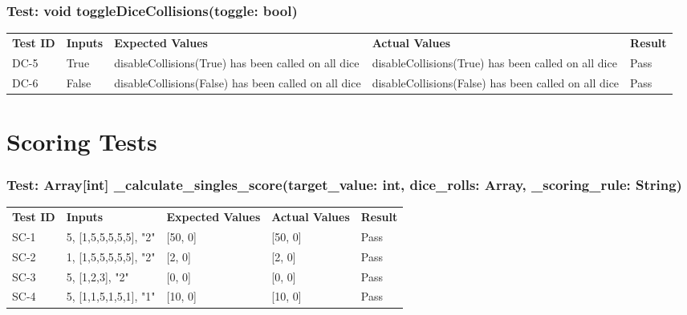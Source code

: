 \documentclass[12pt, titlepage]{article}
\begin{document}
\subsubsection{Test: void toggleDiceCollisions(toggle: bool)}
\begin{tabularx}{\textwidth}{|p{2cm}|p{3.5cm}|p{4cm}|p{4cm}|p{1.5cm}|}
    \cline{1-5}
    \textbf{Test ID} & \textbf{Inputs} & \textbf{Expected Values} & \textbf{Actual Values} & \textbf{Result} \\
    \cline{1-5}
    DC-5 & True & disableCollisions(True) has been called on all dice & disableCollisions(True) has been called on all dice & Pass \\
    \cline{1-5}
    DC-6 & False & disableCollisions(False) has been called on all dice & disableCollisions(False) has been called on all dice & Pass \\
    \cline{1-5}
\end{tabularx}

\section{Scoring Tests}

\subsubsection{Test: Array[int] \_calculate\_singles\_score(target\_value: int, dice\_rolls: Array, \_scoring\_rule: String)}
\begin{tabularx}{\textwidth}{|p{2cm}|p{3.5cm}|p{4cm}|p{4cm}|p{1.5cm}|}
    \cline{1-5}
    \textbf{Test ID} & \textbf{Inputs} & \textbf{Expected Values} & \textbf{Actual Values} & \textbf{Result} \\
    \cline{1-5}
    SC-1 & 5, [1,5,5,5,5,5], "2" & [50, 0] & [50, 0] & Pass \\
    \cline{1-5}
    SC-2 & 1, [1,5,5,5,5,5], "2" & [2, 0] & [2, 0] & Pass \\
    \cline{1-5}
    SC-3 & 5, [1,2,3], "2" & [0, 0] & [0, 0] & Pass \\
    \cline{1-5}
    SC-4 & 5, [1,1,5,1,5,1], "1" & [10, 0] & [10, 0] & Pass \\
    \cline{1-5}
\end{tabularx}
\end{document}
